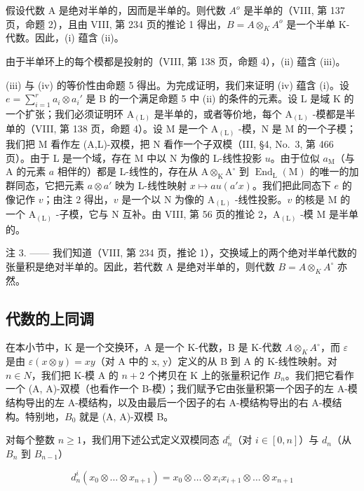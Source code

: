 假设代数 A 是绝对半单的，因而是半单的。则代数 \(A^{o}\) 是半单的（VIII, 第 137 页，命题 2），且由 VIII, 第 234 页的推论 1 得出，\(B = A \otimes_{K} A^{o}\) 是一个半单 K-代数。因此，(i) 蕴含 (ii)。

由于半单环上的每个模都是投射的（VIII, 第 138 页，命题 4），(ii) 蕴含 (iii)。

(iii) 与 (iv) 的等价性由命题 5 得出。为完成证明，我们来证明 (iv) 蕴含 (i)。设 \(e = \sum_{i=1}^{r} a_i \otimes a_i'\) 是 B 的一个满足命题 5 中 (ii) 的条件的元素。设 L 是域 K 的一个扩张；我们必须证明环 \(\mathrm{A}_{(\mathrm{L})}\) 是半单的，或者等价地，每个 \(\mathrm{A}_{(\mathrm{L})}\) -模都是半单的（VIII, 第 138 页，命题 4）。设 M 是一个 \(\mathrm{A}_{(\mathrm{L})}\) -模，N 是 M 的一个子模；我们把 M 看作左 (A,L)-双模，把 N 看作一个子双模（III, §4, No.~3, 第 466 页）。由于 L 是一个域，存在 M 中以 N 为像的 L-线性投影 \(u\)。由于位似 \(a_{\mathrm{M}}\)（与 A 的元素 \(a\) 相伴的）都是 L-线性的，存在从 \(\mathrm{A} \otimes_{\mathrm{K}} \mathrm{A}^{\circ}\) 到 \(\operatorname{End}_{\mathrm{L}}(\mathrm{M})\) 的唯一的加群同态，它把元素 \(a \otimes a'\) 映为 L-线性映射 \(x \mapsto au(a'x)\)。我们把此同态下 \(e\) 的像记作 \(v\)；由注 2 得出，\(v\) 是一个以 N 为像的 \(\mathrm{A}_{(\mathrm{L})}\) -线性投影。\(v\) 的核是 M 的一个 \(\mathrm{A}_{(\mathrm{L})}\) -子模，它与 N 互补。由 VIII, 第 56 页的推论 2，\(\mathrm{A}_{(\mathrm{L})}\) -模 M 是半单的。

注 3. —— 我们知道（VIII, 第 234 页，推论 1），交换域上的两个绝对半单代数的张量积是绝对半单的。因此，若代数 A 是绝对半单的，则代数 \(B = A \otimes_{K} A^{\circ}\) 亦然。

\subsection{代数的上同调}

在本小节中，K 是一个交换环，A 是一个 K-代数，B 是 K-代数 \(A \otimes_{K} A^{\circ}\)，而 \(\varepsilon\) 是由 \(\varepsilon(x \otimes y) = xy\)（对 A 中的 x, y）定义的从 B 到 A 的 K-线性映射。对 \(n \in N\)，我们把 K-模 A 的 \(n + 2\) 个拷贝在 K 上的张量积记作 \(B_{n}\)。我们把它看作一个 (A, A)-双模（也看作一个 B-模）；我们赋予它由张量积第一个因子的左 A-模结构导出的左 A-模结构，以及由最后一个因子的右 A-模结构导出的右 A-模结构。特别地，\(B_{0}\) 就是 (A, A)-双模 B。

对每个整数 \(n \geqslant 1\)，我们用下述公式定义双模同态 \(d_{n}^{i}\)（对 \(i \in [0, n]\)）与 \(d_{n}\)（从 \(B_{n}\) 到 \(B_{n-1}\)）

\[
d _ {n} ^ {i} (x _ {0} \otimes \dots \otimes x _ {n + 1}) = x _ {0} \otimes \dots \otimes x _ {i} x _ {i + 1} \otimes \dots \otimes x _ {n + 1}\tag{4}
\]

